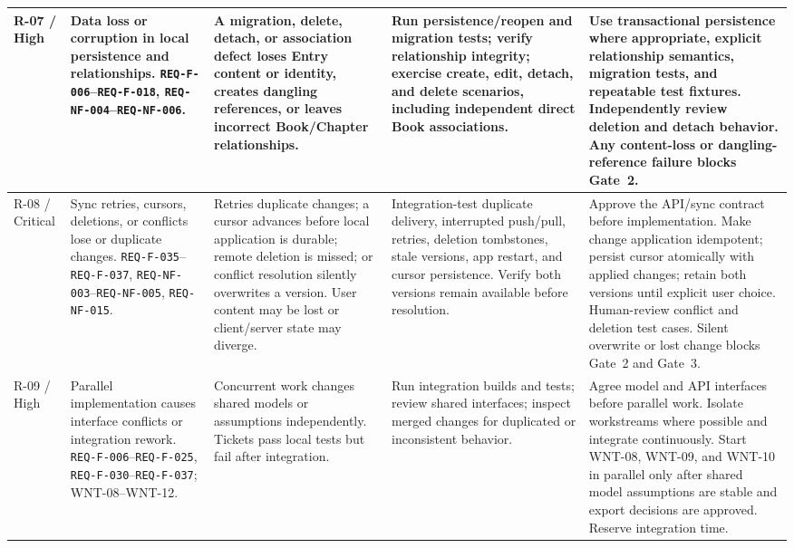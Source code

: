 \documentclass[10pt,a4paper]{article}
\begin{document}
\begin{longtable}{|L{1.15cm}|L{3.1cm}|L{5.6cm}|L{4.4cm}|L{7.1cm}|}
R-07 / High &
Data loss or corruption in local persistence and relationships. \texttt{REQ-F-006}--\texttt{REQ-F-018}, \texttt{REQ-NF-004}--\texttt{REQ-NF-006}. &
A migration, delete, detach, or association defect loses Entry content or identity, creates dangling references, or leaves incorrect Book/Chapter relationships. &
Run persistence/reopen and migration tests; verify relationship integrity; exercise create, edit, detach, and delete scenarios, including independent direct Book associations. &
Use transactional persistence where appropriate, explicit relationship semantics, migration tests, and repeatable test fixtures. Independently review deletion and detach behavior. Any content-loss or dangling-reference failure blocks Gate~2. \\
\hline

R-08 / Critical &
Sync retries, cursors, deletions, or conflicts lose or duplicate changes. \texttt{REQ-F-035}--\texttt{REQ-F-037}, \texttt{REQ-NF-003}--\texttt{REQ-NF-005}, \texttt{REQ-NF-015}. &
Retries duplicate changes; a cursor advances before local application is durable; remote deletion is missed; or conflict resolution silently overwrites a version. User content may be lost or client/server state may diverge. &
Integration-test duplicate delivery, interrupted push/pull, retries, deletion tombstones, stale versions, app restart, and cursor persistence. Verify both versions remain available before resolution. &
Approve the API/sync contract before implementation. Make change application idempotent; persist cursor atomically with applied changes; retain both versions until explicit user choice. Human-review conflict and deletion test cases. Silent overwrite or lost change blocks Gate~2 and Gate~3. \\
\hline

R-09 / High &
Parallel implementation causes interface conflicts or integration rework. \texttt{REQ-F-006}--\texttt{REQ-F-025}, \texttt{REQ-F-030}--\texttt{REQ-F-037}; WNT-08--WNT-12. &
Concurrent work changes shared models or assumptions independently. Tickets pass local tests but fail after integration. &
Run integration builds and tests; review shared interfaces; inspect merged changes for duplicated or inconsistent behavior. &
Agree model and API interfaces before parallel work. Isolate workstreams where possible and integrate continuously. Start WNT-08, WNT-09, and WNT-10 in parallel only after shared model assumptions are stable and export decisions are approved. Reserve integration time. \\
\hline


\end{longtable}
\end{document}
